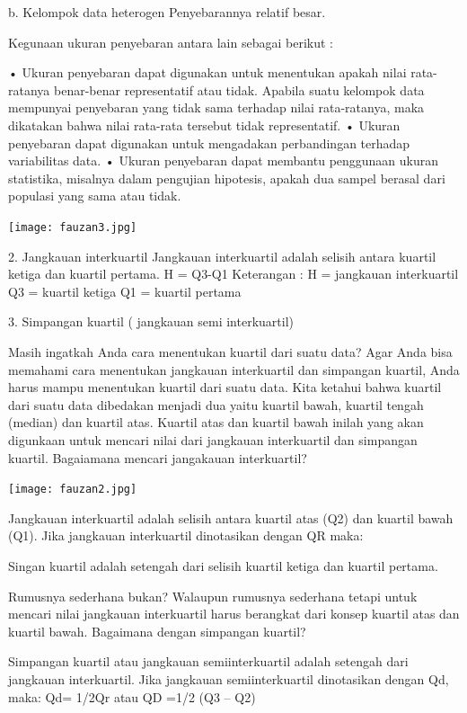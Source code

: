 \documentclass[11pt,fleqn]{book} %
\begin{document}
{b. Kelompok data heterogen 
Penyebarannya relatif besar.

Kegunaan ukuran penyebaran antara lain sebagai berikut :

•	Ukuran penyebaran dapat digunakan untuk menentukan apakah nilai rata-ratanya benar-benar representatif atau tidak. Apabila suatu kelompok data mempunyai penyebaran yang tidak sama terhadap nilai rata-ratanya, maka dikatakan bahwa nilai rata-rata tersebut tidak representatif. 
•	Ukuran penyebaran dapat digunakan untuk mengadakan perbandingan terhadap variabilitas data.
•	Ukuran penyebaran dapat membantu penggunaan ukuran statistika, misalnya dalam pengujian hipotesis, apakah dua sampel berasal dari populasi yang sama atau tidak.

\texttt{[image: fauzan3.jpg]}

2. Jangkauan interkuartil
Jangkauan interkuartil adalah selisih antara kuartil ketiga dan kuartil pertama.
H =  Q3-Q1
Keterangan :
H = jangkauan interkuartil
Q3 = kuartil ketiga
Q1 = kuartil pertama


3. Simpangan kuartil ( jangkauan semi interkuartil)

Masih ingatkah Anda cara menentukan kuartil dari suatu data? Agar Anda bisa memahami cara menentukan jangkauan interkuartil dan simpangan kuartil, Anda harus mampu menentukan
kuartil dari suatu data. Kita ketahui bahwa kuartil dari suatu data dibedakan menjadi dua yaitu kuartil bawah, kuartil tengah (median) dan kuartil atas. Kuartil atas dan kuartil bawah inilah yang akan digunkaan untuk mencari nilai dari jangkauan interkuartil dan simpangan kuartil. Bagaiamana mencari jangakauan interkuartil?

\texttt{[image: fauzan2.jpg]}


Jangkauan interkuartil adalah selisih antara kuartil atas (Q2) dan kuartil bawah (Q1). Jika jangkauan interkuartil dinotasikan dengan QR maka:

Singan kuartil adalah setengah dari selisih kuartil ketiga dan kuartil pertama.



Rumusnya sederhana bukan? Walaupun rumusnya sederhana tetapi untuk mencari nilai jangkauan interkuartil harus berangkat dari konsep kuartil atas dan kuartil bawah. Bagaimana dengan simpangan kuartil?

Simpangan kuartil atau jangkauan semiinterkuartil adalah setengah dari jangkauan interkuartil. Jika jangkauan semiinterkuartil dinotasikan dengan Qd, maka:
Qd= 1/2Qr
atau
QD =1/2 (Q3 – Q2)

}
\end{document}
